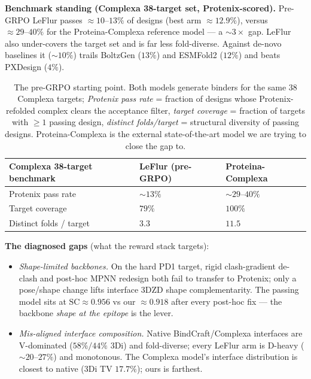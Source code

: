 \documentclass[11pt]{article}
\newcommand{\SC}{\mathrm{SC}}
\begin{document}
\textbf{Benchmark standing (Complexa 38-target set, Protenix-scored).} Pre-GRPO LeFlur passes
$\approx\!10\text{--}13\%$ of designs (best arm $\approx\!12.9\%$), versus $\approx\!29\text{--}40\%$
for the Proteina-Complexa reference model --- a $\sim\!3\times$ gap. LeFlur also under-covers the
target set and is far less fold-diverse. Against de-novo baselines it ($\sim\!10\%$) trails
BoltzGen ($13\%$) and ESMFold2 ($12\%$) and beats PXDesign ($4\%$).

\begin{table}[htbp]
\centering
{\renewcommand{\arraystretch}{1.25}%
\begin{tabular}{@{}>{\raggedright\arraybackslash}p{6.4cm}
                    >{\centering\arraybackslash}p{3.1cm}
                    >{\centering\arraybackslash}p{3.4cm}@{}}
\toprule
\textbf{Complexa 38-target benchmark} & \textbf{LeFlur (pre-GRPO)} & \textbf{Proteina-Complexa}\\
\midrule
Protenix pass rate            & $\sim\!13\%$ & $\sim\!29\text{--}40\%$ \\
Target coverage               & $79\%$       & $100\%$ \\
Distinct folds / target       & $3.3$        & $11.5$ \\
\bottomrule
\end{tabular}}
\caption{The pre-GRPO starting point. Both models generate binders for the same $38$ Complexa
targets; \emph{Protenix pass rate} = fraction of designs whose Protenix-refolded complex clears the
acceptance filter, \emph{target coverage} = fraction of targets with $\geq\!1$ passing design,
\emph{distinct folds/target} = structural diversity of passing designs. Proteina-Complexa is the
external state-of-the-art model we are trying to close the gap to.}
\label{tab:benchmark}
\end{table}

\textbf{The diagnosed gaps} (what the reward stack targets):
\begin{itemize}
\item \emph{Shape-limited backbones.} On the hard PD1 target, rigid clash-gradient de-clash and
  post-hoc MPNN redesign both fail to transfer to Protenix; only a pose/shape change lifts
  interface 3DZD shape complementarity. The passing model sits at $\SC\!\approx\!0.956$ vs our
  $\approx\!0.918$ after every post-hoc fix --- the backbone \emph{shape at the epitope} is the
  lever.
\item \emph{Mis-aligned interface composition.} Native BindCraft/Complexa interfaces are
  V-dominated ($58\%/44\%$ 3Di) and fold-diverse; every LeFlur arm is D-heavy ($\sim\!20\text{--}27\%$)
  and monotonous. The Complexa model's interface distribution is closest to native (3Di TV
  $17.7\%$); ours is farthest.
\end{itemize}
\end{document}
